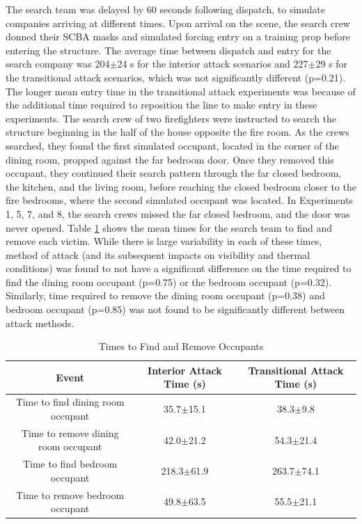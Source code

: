 \documentclass[12pt,oneside]{article}
\begin{document}
The search team was delayed by 60 seconds following dispatch, to simulate companies arriving at different times. Upon arrival on the scene, the search crew donned their SCBA masks and simulated forcing entry on a training prop before entering the structure. The average time between dispatch and entry for the search company was 204$\pm$24 s for the interior attack scenarios and 227$\pm$29 s for the transitional attack scenarios, which was not significantly different (p=0.21). The longer mean entry time in the transitional attack experiments was because of the additional time required to reposition the line to make entry in these experiments. The search crew of two firefighters were instructed to search the structure beginning in the half of the house opposite the fire room. As the crews searched, they found the first simulated occupant, located in the corner of the dining room, propped against the far bedroom door. Once they removed this occupant, they continued their search pattern through the far closed bedroom, the kitchen, and the living room, before reaching the closed bedroom closer to the fire bedrooms, where the second simulated occupant was located. In Experiments 1, 5, 7, and 8, the search crews missed the far closed bedroom, and the door was never opened. Table \ref{tab:victim_times} shows the mean times for the search team to find and remove each victim. While there is large variability in each of these times, method of attack (and its subsequent impacts on visibility and thermal conditions) was found to not have a significant difference on the time required to find the dining room occupant (p=0.75) or the bedroom occupant (p=0.32). Similarly, time required to remove the dining room occupant (p=0.38) and bedroom occupant (p=0.85) was not found to be significantly different between attack methods. 

\begin{table}[!ht]
    \centering
    \caption{Times to Find and Remove Occupants}
    \label{tab:victim_times}
    \begin{tabular}{ccc}
    \toprule[1.5pt]
 	 Event&								Interior Attack Time (s)&	Transitional Attack Time (s)\\
 	\midrule 
  	Time to find dining room occupant&	35.7$\pm$15.1&				38.3$\pm$9.8\\
  	Time to remove dining room occupant&	42.0$\pm$21.2&				54.3$\pm$21.4\\
  	Time to find bedroom occupant&		218.3$\pm$61.9&				263.7$\pm$74.1\\
  	Time to remove bedroom occupant&		49.8$\pm$63.5&				55.5$\pm$21.1\\
 	\bottomrule[1.25pt] 
    \end{tabular}
\end{table}
\end{document}
